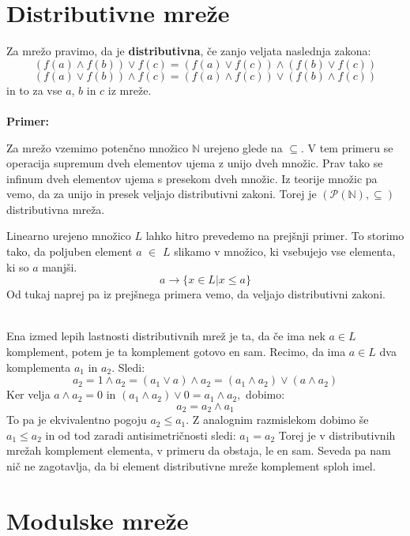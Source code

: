 \documentclass[a4paper]{article}
\newcounter{environment:definition_counter}
\newcounter{environment:theorem_counter}
\newcounter{environment:statement_counter}
\newcounter{example:example_counter}
\newenvironment{example}
{\textbf{Primer:}\\}
{\setcounter{example:example_counter}{0}}
\newenvironment{example_case}
{\refstepcounter{example:example_counter} \arabic{example:example_counter}.}
{\\}
\begin{document}
\section{Distributivne mreže}
\label{sec:distributivne_mreze}
Za mrežo pravimo, da je \textbf{distributivna}, če zanjo veljata naslednja zakona:
$$ (f(a) \land f(b)) \lor f(c) = (f(a) \lor f(c)) \land (f(b) \lor f(c))$$
$$ (f(a) \lor f(b)) \land f(c) = (f(a) \land f(c)) \lor (f(b) \land f(c))$$
in to za vse $a$, $b$ in $c$ iz mreže. \\ \\
\begin{example}
\begin{example_case}
Za mrežo vzemimo potenčno množico $\mathbb{N}$ urejeno glede na $\subseteq$. V tem primeru se operacija supremum dveh elementov ujema z unijo dveh množic. Prav tako se infinum dveh elementov ujema s presekom dveh množic. Iz teorije množic pa vemo, da za unijo in presek veljajo distributivni zakoni. Torej je $(\mathcal{P}(\mathbb{N}),\subseteq)$ distributivna mreža.
\end{example_case}
\begin{example_case}
Linearno urejeno množico $L$ lahko hitro prevedemo na prejšnji primer. To storimo tako, da poljuben element $a$ $\in$ $L$ slikamo v množico, ki vsebujejo vse elementa, ki so $a$ manjši.
$$ a \rightarrow \{ x \in L  |  x \leq a \}$$
Od tukaj naprej pa iz prejšnega primera vemo, da veljajo distributivni zakoni.
\end{example_case}\\
Ena izmed lepih lastnosti distributivnih mrež je ta, da če ima nek $a \in L$ komplement, potem je ta komplement gotovo en sam. Recimo, da ima $a \in L$ dva komplementa $a_{1}$ in $a_{2}$. Sledi:
$$ a_{2} = 1 \land a_{2} = (a_{1} \lor a) \land a_{2} = (a_{1} \land a_{2}) \lor (a \land a_{2}) $$
Ker velja $a \land a_{2} = 0$ in $(a_{1} \land a_{2}) \lor 0 = a_{1} \land a_{2},$ dobimo:
$$ a_{2} = a_{2} \land a_{1} $$ 
To pa je ekvivalentno pogoju $a_{2} \leq a_{1}$. Z analognim razmislekom dobimo še $a_{1} \leq a_{2}$ in od tod zaradi antisimetričnosti sledi: $ a_{1} = a_{2} $
Torej je v distributivnih mrežah komplement elementa, v primeru da obstaja, le en sam. Seveda pa nam nič ne zagotavlja, da bi element distributivne mreže komplement sploh imel.
\end{example}

\section{Modulske mreže}
\label{sec:modulske_mreze}
\end{document}
